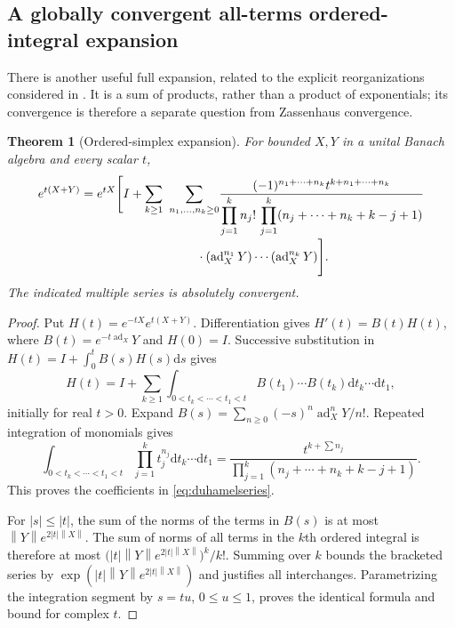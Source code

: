 \documentclass[11pt]{article}
\newtheorem{theorem}{Theorem}[section]
\theoremstyle{definition}
\theoremstyle{remark}
\newcommand{\dd}{\mathrm d}
\newcommand{\ad}{\operatorname{ad}}
\newcommand{\norm}[1]{\left\lVert #1\right\rVert}
\numberwithin{equation}{section}
\begin{document}
\subsection{A globally convergent all-terms ordered-integral expansion}
There is another useful full expansion, related to the explicit reorganizations considered in \cite{kimura}. It is a sum of products, rather than a product of exponentials; its convergence is therefore a separate question from Zassenhaus convergence.
\begin{theorem}[Ordered-simplex expansion]\label{thm:duhamelseries}
For bounded $X,Y$ in a unital Banach algebra and every scalar $t$,
\begin{equation}\label{eq:duhamelseries}
\begin{split}
 e^{t(X+Y)}=e^{tX}\Biggl[I+
 \sum_{k\geq1}\ \sum_{n_1,\ldots,n_k\geq0}
 &\frac{(-1)^{n_1+\cdots+n_k}t^{k+n_1+\cdots+n_k}}
 {\displaystyle\prod_{j=1}^{k}n_j!\,
  \prod_{j=1}^{k}(n_j+\cdots+n_k+k-j+1)}\\[-2pt]
 &\hspace{-18pt}\cdot(\ad_X^{n_1}Y)\cdots(\ad_X^{n_k}Y)\Biggr].
\end{split}
\end{equation}
The indicated multiple series is absolutely convergent.
\end{theorem}
\begin{proof}
Put $H(t)=e^{-tX}e^{t(X+Y)}$. Differentiation gives
$H'(t)=B(t)H(t)$, where $B(t)=e^{-t\ad_X}Y$ and $H(0)=I$.
Successive substitution in $H(t)=I+\int_0^tB(s)H(s)\dd s$ gives
\[
 H(t)=I+\sum_{k\geq1}
 \int_{0<t_k<\cdots<t_1<t}
           B(t_1)\cdots B(t_k)\dd t_k\cdots\dd t_1,
\]
initially for real $t>0$. Expand
$B(s)=\sum_{n\geq0}(-s)^n\ad_X^nY/n!$. Repeated integration of monomials gives
\[
 \int_{0<t_k<\cdots<t_1<t}\prod_{j=1}^{k}t_j^{n_j}
                      \dd t_k\cdots\dd t_1
 =\frac{t^{k+\sum n_j}}
        {\prod_{j=1}^{k}(n_j+\cdots+n_k+k-j+1)}.
\]
This proves the coefficients in \eqref{eq:duhamelseries}.

For $|s|\leq|t|$, the sum of the norms of the terms in $B(s)$ is at most
$\norm Y e^{2|t|\norm X}$. The sum of norms of all terms in the $k$th ordered integral is therefore at most
$\bigl(|t|\norm Y e^{2|t|\norm X}\bigr)^k/k!$. Summing over $k$ bounds the bracketed series by
$\exp(|t|\norm Y e^{2|t|\norm X})$ and justifies all interchanges. Parametrizing the integration segment by $s=t u$, $0\leq u\leq1$, proves the identical formula and bound for complex $t$.
\end{proof}
\end{document}
